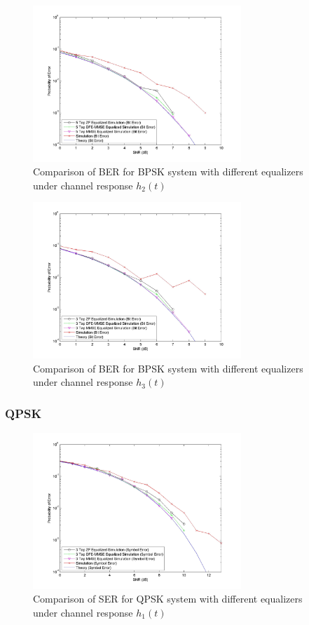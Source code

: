 \documentclass[]{article}
\begin{document}
\begin{figure}[H]
\centering
\includegraphics[width=0.7\textwidth]{bpSNR2.jpg}
\caption{Comparison of BER for BPSK system with different equalizers under channel response $h_2(t)$}
\end{figure}

\begin{figure}[H]
\centering
\includegraphics[width=0.7\textwidth]{bpSNR3.jpg}
\caption{Comparison of BER for BPSK system with different equalizers under channel response $h_3(t)$}
\end{figure}

\subsubsection{QPSK}

\begin{figure}[H]
\centering
\includegraphics[width=0.7\textwidth]{qpSNR1.jpg}
\caption{Comparison of SER for QPSK system with different equalizers under channel response $h_1(t)$}
\end{figure}
\end{document}
